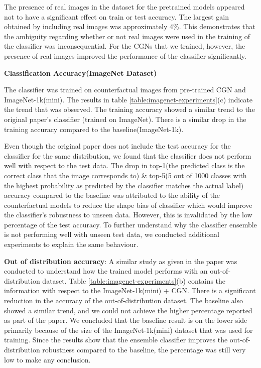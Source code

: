 The presence of real images in the dataset for the pretrained models appeared not to have a significant effect on train or test accuracy. The largest gain obtained by including real images was approximately 4\%. This demonstrates that the ambiguity regarding whether or not real images were used in the training of the classifier was inconsequential. For the CGNs that we trained, however, the presence of real images improved the performance of the classifier significantly. 





\textbf{Classification Accuracy(ImageNet Dataset)}

The classifier was trained on counterfactual images from pre-trained CGN and ImageNet-1k(mini). The results in table \ref{table:imagenet-experiments}(c) indicate the trend that was observed. 
The training accuracy showed a similar trend to the original paper's classifier (trained on ImageNet). There is a similar drop in the training accuracy compared to the baseline(ImageNet-1k). 

Even though the original paper does not include the test accuracy for the classifier for the same distribution, we found that the classifier does not perform well with respect to the test data. The drop in top-1(the predicted class is the correct class that the image corresponds to) \& top-5(5 out of 1000 classes with the highest probability as predicted by the classifier matches the actual label) accuracy compared to the baseline was attributed to the ability of the counterfactual models to reduce the shape bias of classifier which would improve the classifier's robustness to unseen data. However, this is invalidated by the low percentage of the test accuracy. To further understand why the classifier ensemble is not performing well with unseen test data, we conducted additional experiments to explain the same behaviour.

\textbf{Out of distribution accuracy}:
A similar study as given in the paper was conducted to understand how the trained model performs with an out-of-distribution dataset. Table \ref{table:imagenet-experiments}(b) contains the information with respect to the ImageNet-1k(mini) + CGN. There is a significant reduction in the accuracy of the out-of-distribution dataset. The baseline also showed a similar trend, and we could not achieve the higher percentage reported as part of the paper. 
We concluded that the baseline result is on the lower side primarily because of the size of the ImageNet-1k(mini) dataset that was used for training. Since the results show that the ensemble classifier improves the out-of-distribution robustness compared to the baseline, the percentage was still very low to make any conclusion.

